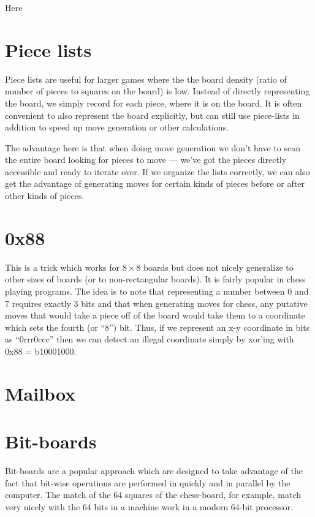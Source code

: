 \documentclass[10pt,dvipdfmx]{report}
\let\x=\times
\begin{document}
Here 

\section{Piece lists}

Piece lists are useful for larger games where the the board density
(ratio of number of pieces to squares on the board) is low.  Instead of
directly representing the board, we simply record for each piece, where
it is on the board.  It is often convenient to also represent the board
explicitly, but can still use piece-lists in addition to speed up move generation
or other calculations.

The advantage here is that when doing move generation we don't have to scan the entire board
looking for pieces to move --- we've got the pieces directly accessible and ready to iterate over.
If we organize the lists correctly, we can also get the advantage of generating moves for certain
kinds of pieces before or after other kinds of pieces.

\section{0x88}
This is a trick which works for $8\x8$ boards but does not
nicely generalize to other sizes of boards (or to non-rectangular boards).
It is fairly popular in chess playing programs.
The idea is to note that representing a number between 0 and 7 requires exactly 3 bits
and that when generating moves for chess, any putative moves that would take a piece off
of the board would take them to a coordinate which sets the fourth (or ``8'') bit.
Thus, if we represent an x-y coordinate in bits as ``0rrr0ccc'' then we can detect an
illegal coordinate simply by xor'ing with 0x88 = b10001000.


\section{Mailbox}

\section{Bit-boards}

Bit-boards are a popular approach which are designed to take advantage
of the fact that bit-wise operations are performed in quickly and in parallel
by the computer.  The match of the 64 squares of the chess-board, for example,
match very nicely with the 64 bits in a machine work in a modern 64-bit processor.
\end{document}
